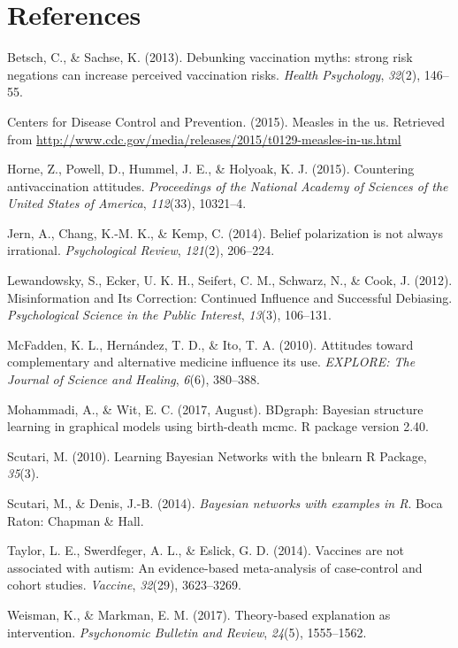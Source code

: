 \documentclass[10pt, letterpaper]{article}
\begin{document}
\section{References}\label{references}

\setlength{\parindent}{-0.1in} \setlength{\leftskip}{0.125in} \noindent

\hypertarget{refs}{}
\hypertarget{ref-Betsch2013}{}
Betsch, C., \& Sachse, K. (2013). Debunking vaccination myths: strong
risk negations can increase perceived vaccination risks. \emph{Health
Psychology}, \emph{32}(2), 146--55.

\hypertarget{ref-CDC2015}{}
Centers for Disease Control and Prevention. (2015). Measles in the us.
Retrieved from
\url{http://www.cdc.gov/media/releases/2015/t0129-measles-in-us.html}

\hypertarget{ref-Horne2015}{}
Horne, Z., Powell, D., Hummel, J. E., \& Holyoak, K. J. (2015).
Countering antivaccination attitudes. \emph{Proceedings of the National
Academy of Sciences of the United States of America}, \emph{112}(33),
10321--4.

\hypertarget{ref-Jern2014}{}
Jern, A., Chang, K.-M. K., \& Kemp, C. (2014). Belief polarization is
not always irrational. \emph{Psychological Review}, \emph{121}(2),
206--224.

\hypertarget{ref-Lewandowsky2012}{}
Lewandowsky, S., Ecker, U. K. H., Seifert, C. M., Schwarz, N., \& Cook,
J. (2012). Misinformation and Its Correction: Continued Influence and
Successful Debiasing. \emph{Psychological Science in the Public
Interest}, \emph{13}(3), 106--131.

\hypertarget{ref-McFadden2010}{}
McFadden, K. L., Hernández, T. D., \& Ito, T. A. (2010). Attitudes
toward complementary and alternative medicine influence its use.
\emph{EXPLORE: The Journal of Science and Healing}, \emph{6}(6),
380--388.

\hypertarget{ref-Mohammadi2017}{}
Mohammadi, A., \& Wit, E. C. (2017, August). BDgraph: Bayesian structure
learning in graphical models using birth-death mcmc. R package version
2.40.

\hypertarget{ref-Scutari2010}{}
Scutari, M. (2010). Learning Bayesian Networks with the bnlearn R
Package, \emph{35}(3).

\hypertarget{ref-Scutari2014}{}
Scutari, M., \& Denis, J.-B. (2014). \emph{Bayesian networks with
examples in R}. Boca Raton: Chapman \& Hall.

\hypertarget{ref-Taylor2014}{}
Taylor, L. E., Swerdfeger, A. L., \& Eslick, G. D. (2014). Vaccines are
not associated with autism: An evidence-based meta-analysis of
case-control and cohort studies. \emph{Vaccine}, \emph{32}(29),
3623--3269.

\hypertarget{ref-Weisman2017}{}
Weisman, K., \& Markman, E. M. (2017). Theory-based explanation as
intervention. \emph{Psychonomic Bulletin and Review}, \emph{24}(5),
1555--1562.
\end{document}
